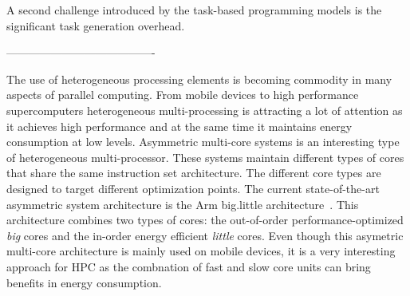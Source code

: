 A second challenge introduced by the task-based programming models is the significant task generation overhead.


 

%

----------------------------------------


The use of heterogeneous processing elements is becoming commodity in many aspects of parallel computing. 
From mobile devices to high performance supercomputers heterogeneous multi-processing is attracting a lot of attention as it achieves high performance and at the same time it maintains energy consumption at low levels. 
Asymmetric multi-core systems is an interesting type of heterogeneous multi-processor. 
These systems maintain different types of cores that share the same instruction set architecture.
The different core types are designed to target different optimization points. 
The current state-of-the-art asymmetric system architecture is the Arm big.little architecture~\cite{ARM,Greenhalgh2011}. 
This architecture combines two types of cores: the out-of-order performance-optimized \textit{big} cores and the in-order energy efficient \textit{little} cores.
Even though this asymetric multi-core architecture is mainly used on mobile devices, it is a very interesting approach for HPC as the combnation of fast and slow core units can bring benefits in energy consumption.




% 
% 
% 

